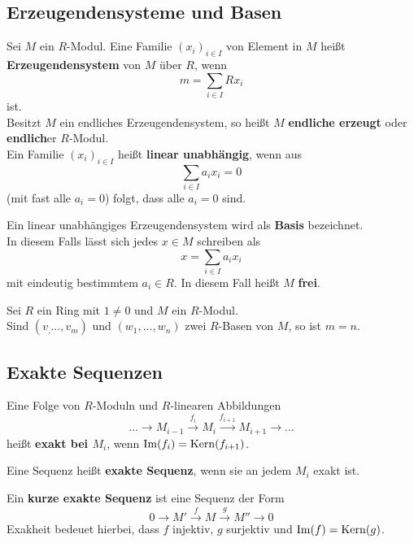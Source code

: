 	\subsection{Erzeugendensysteme und Basen}
	\begin{definition}
		Sei $M$ ein $R$-Modul. Eine Familie $(x_i)_{i\in I}$ von Element in $M$ heißt \textbf{Erzeugendensystem} von $M$ über $R$, wenn
		\[m=\sum_{i\in I}Rx_i\]
		ist.\\
		Besitzt $M$ ein endliches Erzeugendensystem, so heißt $M$ \textbf{endliche erzeugt} oder \textbf{endlich}er $R$-Modul.\\
		Ein Familie $(x_i)_{i\in I}$ heißt \textbf{linear unabhängig}, wenn aus
		\[\sum_{i\in I}a_ix_i=0\]
		(mit fast alle $a_i=0$) folgt, dass alle $a_i=0$ sind.
	\end{definition}
	\begin{definition}
		Ein linear unabhängiges Erzeugendensystem wird als \textbf{Basis} bezeichnet.\\
		In diesem Falls lässt sich jedes $x\in M$ schreiben als
		\[x=\sum_{i\in I}a_ix_i\]
		mit eindeutig bestimmtem $a_i\in R$. In diesem Fall heißt $M$ \textbf{frei}.
	\end{definition}

	\begin{satz}
		Sei $R$ ein Ring mit $1\neq 0$ und $M$ ein $R$-Modul.\\
		Sind $(v_,...,v_m)$ und $(w_1,...,w_n)$ zwei $R$-Basen von $M$, so ist $m=n$.
	\end{satz}

	\subsection{Exakte Sequenzen}
	\begin{definition}
		Eine Folge von $R$-Moduln und $R$-linearen Abbildungen
		\[...\to M_{i-1}\xrightarrow{f_i}M_i\xrightarrow{f_{i+1}}M_{i+1}\to...\]
		heißt \textbf{exakt bei $M_i$}, wenn  $\operatorname{Im}(f_i)=\operatorname{Kern}(f_{i+1})$.
	\end{definition}
	
	\begin{definition}
		Eine Sequenz heißt \textbf{exakte Sequenz}, wenn sie an jedem $M_i$ exakt ist.
	\end{definition}

	\begin{definition}
		Ein \textbf{kurze exakte Sequenz} ist eine Sequenz der Form
		\[0\to M'\xrightarrow{f}M\xrightarrow{g}M''\to 0\]
		Exakheit bedeuet hierbei, dass $f$ injektiv, $g$ surjektiv und $\operatorname{Im}(f)=\operatorname{Kern}(g)$.
	\end{definition}

